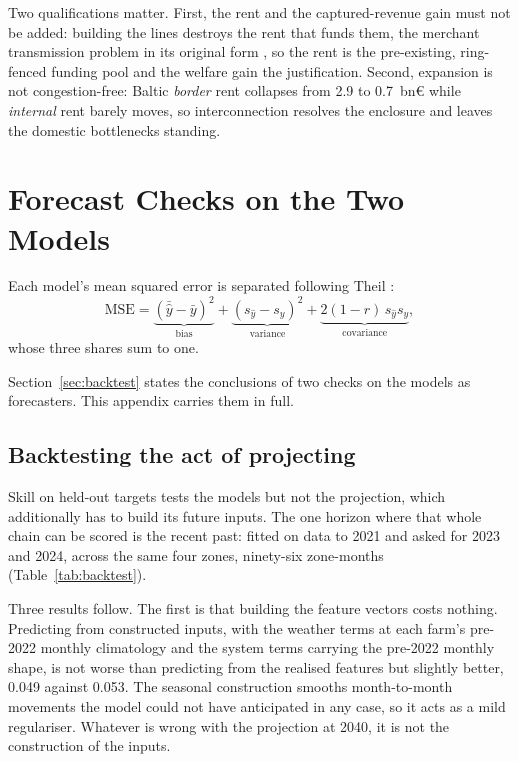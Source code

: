 Two qualifications matter. First, the rent and the captured-revenue gain
must not be added: building the lines destroys the rent that funds them, the
merchant transmission problem in its original form \cite{JoskowTirole2005},
so the rent is the pre-existing, ring-fenced funding pool and the welfare
gain the justification. Second, expansion is not congestion-free: Baltic
\emph{border} rent collapses from 2.9 to 0.7~bn\euro{} while \emph{internal}
rent barely moves, so interconnection resolves the enclosure and leaves the
domestic bottlenecks standing.


\section{Forecast Checks on the Two Models}\label{app:forecast_checks}

Each model's mean squared error is separated following Theil \cite{Theil1966}:
\begin{equation}
\mathrm{MSE} = \underbrace{(\bar{\hat y}-\bar{y})^{2}}_{\text{bias}}
+ \underbrace{(s_{\hat y}-s_{y})^{2}}_{\text{variance}}
+ \underbrace{2(1-r)\,s_{\hat y}s_{y}}_{\text{covariance}},
\label{eq:theil}
\end{equation}
whose three shares sum to one.


Section~\ref{sec:backtest} states the conclusions of two checks on the models
as forecasters. This appendix carries them in full.

\subsection{Backtesting the act of projecting}

Skill on held-out targets tests the models but not the projection, which
additionally has to build its future inputs. The one horizon where that whole
chain can be scored is the recent past: fitted on data to 2021 and asked for
2023 and 2024, across the same four zones, ninety-six zone-months
(Table~\ref{tab:backtest}).

Three results follow. The first is that building the feature vectors costs
nothing. Predicting from constructed inputs, with the weather terms at each
farm's pre-2022 monthly climatology and the system terms carrying the pre-2022
monthly shape, is not worse than predicting from the realised features but
slightly better, 0.049 against 0.053. The seasonal construction smooths
month-to-month movements the model could not have anticipated in any case, so
it acts as a mild regulariser. Whatever is wrong with the projection at 2040, it is not the construction of the inputs.

